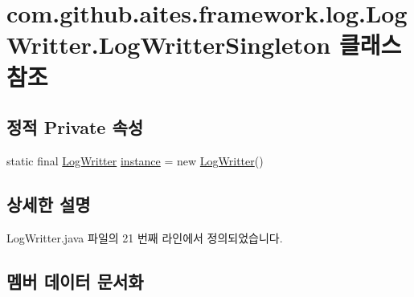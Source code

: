 \hypertarget{classcom_1_1github_1_1aites_1_1framework_1_1log_1_1_log_writter_1_1_log_writter_singleton}{}\section{com.\+github.\+aites.\+framework.\+log.\+Log\+Writter.\+Log\+Writter\+Singleton 클래스 참조}
\label{classcom_1_1github_1_1aites_1_1framework_1_1log_1_1_log_writter_1_1_log_writter_singleton}
\subsection*{정적 Private 속성}
\begin{DoxyCompactItemize}
\item 
static final \mbox{\hyperlink{classcom_1_1github_1_1aites_1_1framework_1_1log_1_1_log_writter}{Log\+Writter}} \mbox{\hyperlink{classcom_1_1github_1_1aites_1_1framework_1_1log_1_1_log_writter_1_1_log_writter_singleton_a6ea434734d68e37ef4aa529f6a6848d2}{instance}} = new \mbox{\hyperlink{classcom_1_1github_1_1aites_1_1framework_1_1log_1_1_log_writter}{Log\+Writter}}()
\end{DoxyCompactItemize}


\subsection{상세한 설명}


Log\+Writter.\+java 파일의 21 번째 라인에서 정의되었습니다.



\subsection{멤버 데이터 문서화}
\mbox{\label{classcom_1_1github_1_1aites_1_1framework_1_1log_1_1_log_writter_1_1_log_writter_singleton_a6ea434734d68e37ef4aa529f6a6848d2}} 
